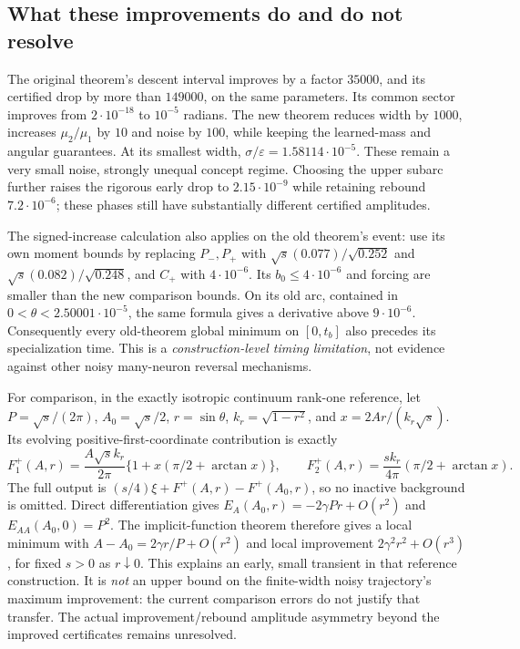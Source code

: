 \documentclass[11pt]{article}
\theoremstyle{remark}
\begin{document}
\subsection{What these improvements do and do not resolve}

The original theorem's descent interval improves by a factor $35000$,
and its certified drop by more than $149000$, on the same parameters.
Its common sector improves from $2\cdot10^{-18}$ to $10^{-5}$ radians.
The new theorem reduces width by $1000$, increases $\mu_2/\mu_1$ by $10$
and noise by $100$, while keeping the learned-mass and angular guarantees.
At its smallest width, $\sigma/\varepsilon=1.58114\cdot10^{-5}$.
These remain a very small noise, strongly unequal concept regime.
Choosing the upper subarc further raises the rigorous early drop to
$2.15\cdot10^{-9}$ while retaining rebound $7.2\cdot10^{-6}$;
these phases still have substantially different certified amplitudes.

The signed-increase calculation also applies on the old theorem's event:
use its own moment bounds by replacing $P_-,P_+$ with
$\sqrt{s}(0.077)/\sqrt{0.252}$ and
$\sqrt{s}(0.082)/\sqrt{0.248}$, and $C_+$ with $4\cdot10^{-6}$.
Its $b_0\le4\cdot10^{-6}$ and forcing are smaller than the new
comparison bounds. On its old arc, contained in
$0<\theta<2.50001\cdot10^{-5}$, the same formula gives a derivative
above $9\cdot10^{-6}$. Consequently every old-theorem
global minimum on $[0,t_b]$ also precedes its specialization time.
This is a \emph{construction-level timing limitation}, not evidence
against other noisy many-neuron reversal mechanisms.

For comparison, in the exactly isotropic continuum rank-one reference,
let $P=\sqrt{s}/(2\pi)$, $A_0=\sqrt{s}/2$, $r=\sin\theta$,
$k_r=\sqrt{1-r^2}$, and $x=2Ar/(k_r\sqrt{s})$.
Its evolving positive-first-coordinate contribution is exactly
\[
 F_1^+(A,r)=\frac{A\sqrt{s}k_r}{2\pi}
       \{1+x(\pi/2+\arctan x)\},\qquad
 F_2^+(A,r)=\frac{s k_r}{4\pi}(\pi/2+\arctan x).
\]
The full output is $(s/4)\xi+F^+(A,r)-F^+(A_0,r)$, so no inactive
background is omitted. Direct differentiation gives
$E_A(A_0,r)=-2\gamma Pr+O(r^2)$ and
$E_{AA}(A_0,0)=P^2$. The implicit-function theorem therefore gives a
local minimum with
$A-A_0=2\gamma r/P+O(r^2)$ and local improvement
$2\gamma^2r^2+O(r^3)$, for fixed $s>0$ as $r\downarrow0$.
This explains an early, small transient in that reference construction.
It is \emph{not} an upper bound on the finite-width noisy trajectory's
maximum improvement: the current comparison errors do not justify that
transfer. The actual improvement/rebound amplitude asymmetry beyond the
improved certificates remains unresolved.
\end{document}

